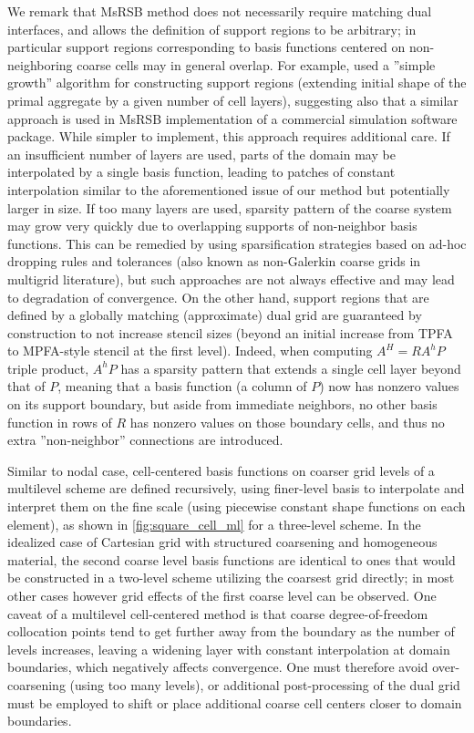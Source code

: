 We remark that MsRSB method does not necessarily require matching dual interfaces, and allows the definition of support regions to be arbitrary; in particular support regions corresponding to basis functions centered on non-neighboring coarse cells may in general overlap.   For example, \cite{Klemetsdal2020} used a ''simple growth'' algorithm for constructing support regions (extending initial shape of the primal aggregate by a given number of cell layers), suggesting also that a similar approach is used in MsRSB implementation of a commercial simulation software package.   While simpler to implement, this approach requires additional care.   If an insufficient number of layers are used, parts of the domain may be interpolated by a single basis function, leading to patches of constant interpolation similar to the aforementioned issue of our method but potentially larger in size.   If too many layers are used, sparsity pattern of the coarse system may grow very quickly due to overlapping supports of non-neighbor basis functions.   This can be remedied by using sparsification strategies based on ad-hoc dropping rules and tolerances (also known as non-Galerkin coarse grids in multigrid literature), but such approaches are not always effective and may lead to degradation of convergence.   On the other hand, support regions that are defined by a globally matching (approximate) dual grid are guaranteed by construction to not increase stencil sizes (beyond an initial increase from TPFA to MPFA-style stencil at the first level).   Indeed, when computing $A^H = RA^hP$ triple product, $A^hP$ has a sparsity pattern that extends a single cell layer beyond that of $P$, meaning that a basis function (a column of $P$) now has nonzero values on its support boundary, but aside from immediate neighbors, no other basis function in rows of $R$ has nonzero values on those boundary cells, and thus no extra ''non-neighbor'' connections are introduced.

Similar to nodal case, cell-centered basis functions on coarser grid levels of a multilevel scheme are defined recursively, using finer-level basis to interpolate and interpret them on the fine scale (using piecewise constant shape functions on each element), as shown in \autoref{fig:square_cell_ml} for a three-level scheme.   In the idealized case of Cartesian grid with structured coarsening and homogeneous material, the second coarse level basis functions are identical to ones that would be constructed in a two-level scheme utilizing the coarsest grid directly; in most other cases however grid effects of the first coarse level can be observed.   One caveat of a multilevel cell-centered method is that coarse degree-of-freedom collocation points tend to get further away from the boundary as the number of levels increases, leaving a widening layer with constant interpolation at domain boundaries, which negatively affects convergence.   One must therefore avoid over-coarsening (using too many levels), or additional post-processing of the dual grid must be employed to shift or place additional coarse cell centers closer to domain boundaries.

